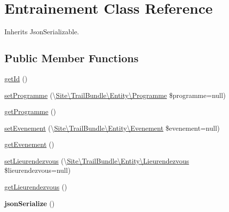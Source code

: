\hypertarget{class_site_1_1_trail_bundle_1_1_entity_1_1_entrainement}{}\section{Entrainement Class Reference}
\label{class_site_1_1_trail_bundle_1_1_entity_1_1_entrainement}


Inherits Json\+Serializable.

\subsection*{Public Member Functions}
\begin{DoxyCompactItemize}
\item 
\hyperlink{class_site_1_1_trail_bundle_1_1_entity_1_1_entrainement_a12251d0c022e9e21c137a105ff683f13}{get\+Id} ()
\item 
\hyperlink{class_site_1_1_trail_bundle_1_1_entity_1_1_entrainement_a8be2a30adb7994ebc270c6d6d3285b50}{set\+Programme} (\textbackslash{}\hyperlink{class_site_1_1_trail_bundle_1_1_entity_1_1_programme}{Site\textbackslash{}\+Trail\+Bundle\textbackslash{}\+Entity\textbackslash{}\+Programme} \$programme=null)
\item 
\hyperlink{class_site_1_1_trail_bundle_1_1_entity_1_1_entrainement_aaf22f4a3d8f514af2f87e4fd347a232d}{get\+Programme} ()
\item 
\hyperlink{class_site_1_1_trail_bundle_1_1_entity_1_1_entrainement_a6ed044dcb38f66a09b105075b59bd8ed}{set\+Evenement} (\textbackslash{}\hyperlink{class_site_1_1_trail_bundle_1_1_entity_1_1_evenement}{Site\textbackslash{}\+Trail\+Bundle\textbackslash{}\+Entity\textbackslash{}\+Evenement} \$evenement=null)
\item 
\hyperlink{class_site_1_1_trail_bundle_1_1_entity_1_1_entrainement_a0d200fcb8e70d13b45e20baf2269ed3f}{get\+Evenement} ()
\item 
\hyperlink{class_site_1_1_trail_bundle_1_1_entity_1_1_entrainement_a5dc3f5a82e8d1722058c57265ea6bf0e}{set\+Lieurendezvous} (\textbackslash{}\hyperlink{class_site_1_1_trail_bundle_1_1_entity_1_1_lieurendezvous}{Site\textbackslash{}\+Trail\+Bundle\textbackslash{}\+Entity\textbackslash{}\+Lieurendezvous} \$lieurendezvous=null)
\item 
\hyperlink{class_site_1_1_trail_bundle_1_1_entity_1_1_entrainement_a5d3814ddf8f5e72117a6179bc51e49e9}{get\+Lieurendezvous} ()
\item 
\hypertarget{class_site_1_1_trail_bundle_1_1_entity_1_1_entrainement_ad402d8679325bc514874370f02b5c2ac}{}{\bfseries json\+Serialize} ()\label{class_site_1_1_trail_bundle_1_1_entity_1_1_entrainement_ad402d8679325bc514874370f02b5c2ac}

\end{DoxyCompactItemize}


